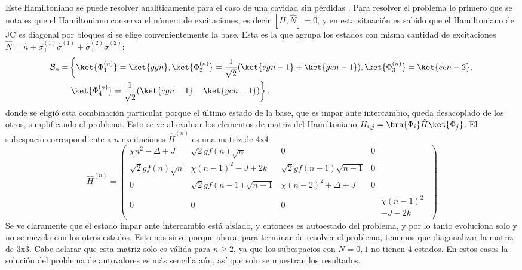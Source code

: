 Este Hamiltoniano se puede resolver analíticamente para el caso de una cavidad sin pérdidas \cite{Santos2016}. Para resolver el problema lo primero que se nota es que el Hamiltoniano conserva el número de excitaciones, es decir $[H,\hat N]=0$, y en esta situación es sabido que el Hamiltoniano de JC es diagonal por bloques si se elige convenientemente la base. Esta es la que agrupa los estados con misma cantidad de excitaciones $\hat N = \hat n + \hat \sigma_+^{(1)}\hat \sigma_-^{(1)}+\hat \sigma_+^{(2)}\hat \sigma_-^{(2)}$: 
\begin{equation}
\begin{split}
    \mathcal{B}_n=& \left\{\ket{\Phi^{(n)}_1}=\ket{ggn},\ket{\Phi^{(n)}_2}=\frac{1}{\sqrt{2}}(\ket{egn-1}+\ket{gen-1}),\ket{\Phi^{(n)}_3}=\ket{een-2},\right. \\
& \left. \ket{\Phi^{(n)}_4}=\frac{1}{\sqrt{2}}(\ket{egn-1}-\ket{gen-1})\right\} ,
\end{split}
\label{ec4:base}
\end{equation}
donde se eligi\'o esta combinaci\'on particular porque el último estado de la base, que es impar ante intercambio, queda desacoplado de los otros, simplificando el problema. Esto se ve al evaluar los elementos de matriz del Hamiltoniano $H_{i,j}=\bra{\Phi_i}\hat H \ket{\Phi_j}$. El subespacio correspondiente a $n$ excitaciones $\hat H^{(n)}$ es una matriz de 4x4
\begin{equation}
    \hat H^{(n)}=
    \begin{pmatrix}
     \chi n^2 - \Delta +  J & \sqrt{2} g f(n)\sqrt{n} & 0 & 0 \\
    \sqrt{2} g f(n)\sqrt{n} &  \chi (n-1)^2  -  J + 2 k & \sqrt{2} g f(n-1)\sqrt{n-1} & 0 \\
    0 & \sqrt{2} g f(n-1)\sqrt{n-1} &  \chi (n-2)^2 +  \Delta +  J & 0 \\
    0&0&0& \begin{aligned} 
                 & \chi (n-1)^2  \\ 
                 &-  J - 2 k
        \end{aligned}
    \end{pmatrix}
\end{equation}
Se ve claramente que el estado impar ante intercambio está aislado, y entonces es autoestado del problema, y por lo tanto evoluciona solo y no se mezcla con los otros estados. Esto nos sirve porque ahora, para terminar de resolver el problema, tenemos que diagonalizar la matriz de 3x3. Cabe aclarar que esta matriz solo es válida para $n\geq 2$, ya que los subespacios con $N=0,1$ no tienen 4 estados. En estos casos la soluci\'on del problema de autovalores es más sencilla aún, as\'i que solo se muestran los resultados. \newline
